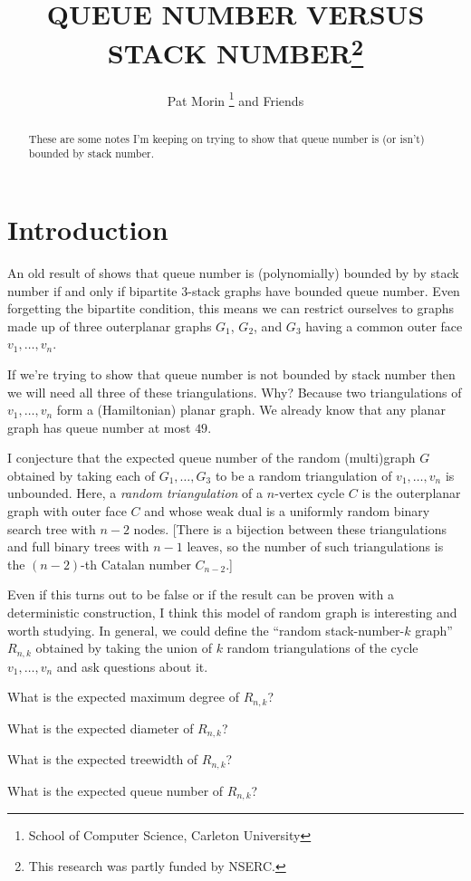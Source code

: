 \documentclass{patmorin}
\title{\MakeUppercase{Queue Number versus Stack Number}\thanks{This research was partly funded by NSERC.}}
\author{Pat Morin%
    \thanks{School of Computer Science, Carleton University}\quad
    and Friends}
\date{}
\begin{document}
\maketitle

\begin{abstract}
    These are some notes I'm keeping on trying to show that queue number is (or isn't) bounded by stack number.
\end{abstract}

%



\section{Introduction}

An old result of \citet[Theorem 8]{dujmovic.wood:stacks} shows that queue number is (polynomially) bounded by by stack number if and only if bipartite 3-stack graphs have bounded queue number.  Even forgetting the bipartite condition, this means we can restrict ourselves to graphs made up of three outerplanar graphs $G_1$, $G_2$, and $G_3$ having a common outer face $v_1,\ldots,v_n$.

If we're trying to show that queue number is not bounded by stack number then we will need all three of these triangulations.  Why? Because two triangulations of $v_1,\ldots,v_n$ form a (Hamiltonian) planar graph.  We already know that any planar graph has queue number at most $49$.

I conjecture that the expected queue number of the random (multi)graph $G$ obtained by taking each of $G_1,\ldots,G_3$ to be a random triangulation of $v_1,\ldots,v_n$ is unbounded.  Here, a \emph{random triangulation} of a $n$-vertex cycle $C$ is the outerplanar graph with outer face $C$ and whose weak dual is a uniformly random binary search tree with $n-2$ nodes.  [There is a bijection between these triangulations and full binary trees with $n-1$ leaves, so the number of such triangulations is the $(n-2)$-th Catalan number $C_{n-2}$.]

Even if this turns out to be false or if the result can be proven with a deterministic construction, I think this model of random graph is interesting and worth studying.  In general, we could define the ``random stack-number-$k$ graph'' $R_{n,k}$ obtained by taking the union of $k$ random triangulations of the cycle $v_1,\ldots,v_n$ and ask questions about it.
\begin{compactenum}
    \item What is the expected maximum degree of $R_{n,k}$?
    \item What is the expected diameter of $R_{n,k}$?
    \item What is the expected treewidth of $R_{n,k}$?
    \item What is the expected queue number of $R_{n,k}$?
\end{compactenum}
\end{document}
